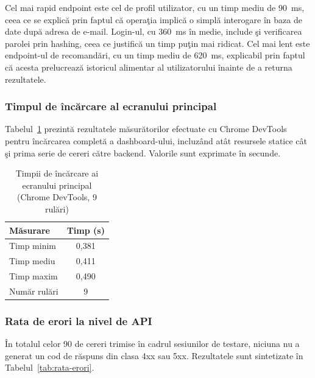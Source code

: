 \documentclass[12pt,a4paper]{article}
\begin{document}
\vspace{6pt}

Cel mai rapid endpoint este cel de profil utilizator, cu un timp mediu de 90~ms, ceea ce se explic\u{a} prin faptul c\u{a} opera\c{t}ia implic\u{a} o simpl\u{a} interogare \^{i}n baza de date dup\u{a} adresa de e-mail. Login-ul, cu 360~ms \^{i}n medie, include \c{s}i verificarea parolei prin hashing, ceea ce justific\u{a} un timp pu\c{t}in mai ridicat. Cel mai lent este endpoint-ul de recomand\u{a}ri, cu un timp mediu de 620~ms, explicabil prin faptul c\u{a} acesta prelucreaz\u{a} istoricul alimentar al utilizatorului \^{i}nainte de a returna rezultatele.

\subsubsection*{Timpul de \^{i}nc\u{a}rcare al ecranului principal}

Tabelul~\ref{tab:timp-dashboard} prezint\u{a} rezultatele m\u{a}sur\u{a}torilor efectuate cu Chrome DevTools pentru \^{i}nc\u{a}rcarea complet\u{a} a dashboard-ului, incluz\^{a}nd at\^{a}t resursele statice c\^{a}t \c{s}i prima serie de cereri c\u{a}tre backend. Valorile sunt exprimate \^{i}n secunde.

\begin{table}[h!]
  \centering
  \caption{Timpii de \^{i}nc\u{a}rcare ai ecranului principal (Chrome DevTools, 9 rul\u{a}ri)}
  \label{tab:timp-dashboard}
  \vspace{4pt}
  \begin{tabular}{@{}lc@{}}
    \toprule
    \textbf{M\u{a}surare} & \textbf{Timp (s)} \\
    \midrule
    Timp minim           & 0{,}381 \\
    Timp mediu           & 0{,}411 \\
    Timp maxim           & 0{,}490 \\
    Num\u{a}r rul\u{a}ri & 9       \\
    \bottomrule
  \end{tabular}
\end{table}

\vspace{6pt}

\subsubsection*{Rata de erori la nivel de API}

\^{I}n totalul celor 90 de cereri trimise \^{i}n cadrul sesiunilor de testare, niciuna nu a generat un cod de r\u{a}spuns din clasa 4xx sau 5xx. Rezultatele sunt sintetizate \^{i}n Tabelul~\ref{tab:rata-erori}.
\end{document}
